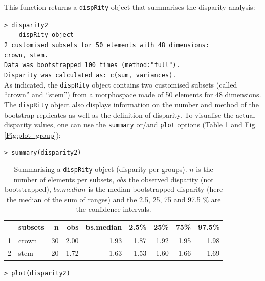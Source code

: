 \documentclass[12pt,letterpaper]{article}
\newcommand{\disp}{\texttt{dispRity} }
\begin{document}
This function returns a \disp object that summarises the disparity analysis:

\noindent \texttt{> disparity2}\\
\noindent \texttt{ ---- dispRity object ---- }\\
\noindent \texttt{2 customised subsets for 50 elements with 48 dimensions:}\\
          \texttt{crown, stem.}\\
\noindent \texttt{Data was bootstrapped 100 times (method:"full").}\\
\noindent \texttt{Disparity was calculated as: c(sum, variances).}\\

\bigskip
As indicated, the \disp object contains two customised subsets (called ``crown'' and ``stem'') from a morphospace made of 50 elements for 48 dimensions.
The \disp object also displays information on the number and method of the bootstrap replicates as well as the definition of disparity.
To visualise the actual disparity values, one can use the \texttt{summary} or/and \texttt{plot} options (Table \ref{Tab:summary_group} and Fig. \ref{Fig:plot_group}):


\noindent \texttt{> summary(disparity2)}

\begin{table}[ht]
\centering
\begin{tabular}{rlrrrrrrr}
  \hline
 & subsets & n & obs & bs.median & 2.5\% & 25\% & 75\% & 97.5\% \\ 
  \hline
1 & crown &  30 & 2.00 & 1.93 & 1.87 & 1.92 & 1.95 & 1.98 \\ 
  2 & stem &  20 & 1.72 & 1.63 & 1.53 & 1.60 & 1.66 & 1.69 \\ 
   \hline
\end{tabular}
\caption{Summarising a \disp object (disparity per groups). $n$ is the number of elements per subsets, $obs$ the observed disparity (not bootstrapped), $bs.median$ is the median bootstrapped disparity (here the median of the sum of ranges) and the 2.5, 25, 75 and 97.5
\% are the confidence intervals.}
\label{Tab:summary_group}
\end{table}

\noindent \texttt{> plot(disparity2)}
\end{document}
